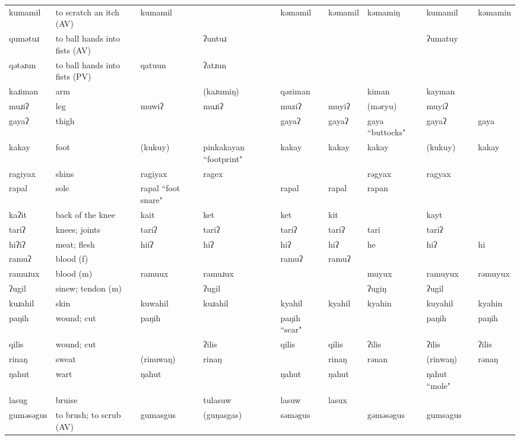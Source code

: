 \begin{landscape}
\begin{longtable}{*{9}{>{\raggedright\arraybackslash}p{}}}
\text{*}kumamil & to scratch an itch (AV) & kumamil &  & kəmamil & kəmamil & kəmamiŋ & kumamil & kəmamin\\
\text{*}qumətuɹ & to ball hands into fists (AV) &  & ʔuntuɹ &  &  &  & ʔumatuy & \\
\text{*}qətəɹun & to ball hands into fists (PV) & qatuun & ʔatɹun &  &  &  &  & \\
\text{*}kaɹiman & arm &  & (kaɹumiŋ) & qəziman &  & kiman & kayman & \\
\text{*}muɹiʔ & leg & muwiʔ & muɹiʔ & muziʔ & muyiʔ & (məryu) & muyiʔ & \\
\text{*}gayaʔ & thigh &  &  & gayaʔ & gayaʔ & gaya \newline ``buttocks" & gayaʔ & gaya\\
\text{*}kakay & foot & (kukuy) & pinkakayan ``footprint" & kakay & kakay & kakay & (kukuy) & kakay\\
\text{*}ragiyax & shins & ragiyax & ragex &  &  & rəgyax & ragyax & \\
\text{*}rapal & sole & rapal \newline ``foot snare" &  & rapal & rapal & rapan &  & \\
\text{*}kaʔit & back of the knee & kait & ket & ket & kit &  & kayt & \\
\text{*}tariʔ & knees; joints & tariʔ & tariʔ & tariʔ & tariʔ & tari & tariʔ & \\
\text{*}hiʔiʔ & meat; flesh & hiiʔ & hiʔ & hiʔ & hiʔ & he & hiʔ & hi\\
\text{*}ramuʔ & blood (f) &  &  & ramuʔ & ramuʔ &  &  & \\
\text{*}ramuɹux & blood (m) & ramuux & ramuɹux &  &  & muyux & ramuyux & rəmuyux\\
\text{*}ʔugil & sinew; tendon (m) &  & ʔugil &  &  & ʔugiŋ & ʔugil & \\
\text{*}kuɹahil & skin & kuwahil & kuɹahil & kyahil & kyahil & kyahin & kuyahil & kyahin\\
\text{*}paŋih & wound; cut & paŋih &  & paŋih ``scar" &  &  & paŋih & paŋih\\
\text{*}qilis & wound; cut &  & ʔilis & qilis & qilis & ʔilis & ʔilis & ʔilis\\
\text{*}rinaŋ & sweat & (rinuwaŋ) & rinaŋ &  & rinaŋ & rənan & (rinwaŋ) & rənaŋ\\
\text{*}ŋahut & wart & ŋahut &  & ŋahut & ŋahut &  & ŋahut ``mole" & \\
\text{*}lasug & bruise &  & tulasuw & lasuw & lasux &  &  & \\
\text{*}guməsəgus & to brush; to scrub (AV) & gumasgus & (guŋasgas) & səməgus &  & gəməsəgus & gumsagus & \\

\end{longtable}
\end{landscape}
